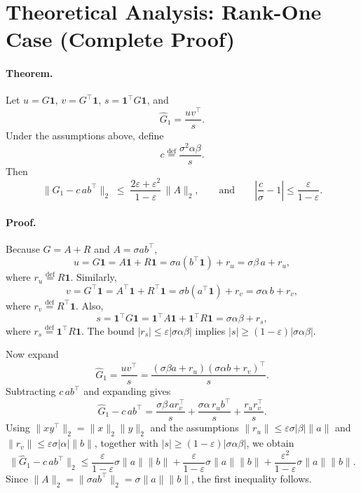 \documentclass[11pt]{book}
\begin{document}
\section{Theoretical Analysis: Rank-One Case (Complete Proof)}

\paragraph{Theorem.}
Let $u=G\mathbf{1}$, $v=G^\top\mathbf{1}$, $s=\mathbf{1}^\top G \mathbf{1}$, and
\[
\widehat{G}_1 = \frac{u v^\top}{s}.
\]
Under the assumptions above, define
\[
c \stackrel{\mathrm{def}}{=} \frac{\sigma^2 \alpha \beta}{s}.
\]
Then
\[
\|\widehat{G}_1 - c\,ab^\top\|_2
\;\le\;
\frac{2\varepsilon+\varepsilon^2}{1-\varepsilon}\,\|A\|_2,
\qquad
\text{and}\qquad
\left|\frac{c}{\sigma}-1\right|\le \frac{\varepsilon}{1-\varepsilon}.
\]

\paragraph{Proof.}
Because $G=A+R$ and $A=\sigma ab^\top$,
\[
u = G\mathbf{1} = A\mathbf{1} + R\mathbf{1}
= \sigma a(b^\top\mathbf{1}) + r_u
= \sigma\beta\, a + r_u,
\]
where $r_u \stackrel{\mathrm{def}}{=} R\mathbf{1}$.
Similarly,
\[
v = G^\top\mathbf{1} = A^\top\mathbf{1} + R^\top\mathbf{1}
= \sigma b(a^\top\mathbf{1}) + r_v
= \sigma\alpha\, b + r_v,
\]
where $r_v \stackrel{\mathrm{def}}{=} R^\top\mathbf{1}$.
Also,
\[
s=\mathbf{1}^\top G\mathbf{1} = \mathbf{1}^\top A\mathbf{1} + \mathbf{1}^\top R\mathbf{1}
= \sigma\alpha\beta + r_s,
\]
where $r_s\stackrel{\mathrm{def}}{=}\mathbf{1}^\top R\mathbf{1}$.
The bound $|r_s|\le \varepsilon|\sigma\alpha\beta|$ implies
$|s|\ge (1-\varepsilon)|\sigma\alpha\beta|$.

Now expand
\[
\widehat{G}_1 = \frac{uv^\top}{s}
= \frac{(\sigma\beta a + r_u)(\sigma\alpha b + r_v)^\top}{s}.
\]
Subtracting $c\,ab^\top$ and expanding gives
\[
\widehat{G}_1 - c\,ab^\top
= \frac{\sigma\beta\, a r_v^\top}{s}
+ \frac{\sigma\alpha\, r_u b^\top}{s}
+ \frac{r_u r_v^\top}{s}.
\]
Using $\|xy^\top\|_2=\|x\|_2\|y\|_2$ and the assumptions
$\|r_u\|\le \varepsilon\sigma|\beta|\|a\|$ and
$\|r_v\|\le \varepsilon\sigma|\alpha|\|b\|$,
together with $|s|\ge (1-\varepsilon)|\sigma\alpha\beta|$, we obtain
\[
\|\widehat{G}_1 - c\,ab^\top\|_2
\le
\frac{\varepsilon}{1-\varepsilon}\sigma\|a\|\|b\|
+\frac{\varepsilon}{1-\varepsilon}\sigma\|a\|\|b\|
+\frac{\varepsilon^2}{1-\varepsilon}\sigma\|a\|\|b\|.
\]
Since $\|A\|_2=\|\sigma ab^\top\|_2=\sigma\|a\|\|b\|$, the first inequality follows.
\end{document}
